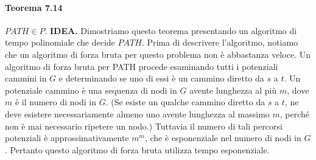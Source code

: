 \documentclass{article}
\begin{document}
\paragraph{Teorema 7.14}
\label{teorema-7.14}
\vspace{1em}
\text{}
\newline
$PATH \in P$.
\newline
\textbf{IDEA.}
Dimostriamo questo teorema presentando un algoritmo di tempo polinomiale che decide $PATH$.
Prima di descrivere l'algoritmo, notiamo che un algoritmo di forza bruta per questo problema non è abbastanza veloce. 
Un algoritmo di forza bruta per PATH procede esaminando tutti i potenziali cammini in $G$ e determinando se uno di essi è un cammino diretto da $s$ a $t$.
Un potenziale cammino è una sequenza di nodi in $G$ avente lunghezza al più $m$, dove $m$ è il numero di nodi in $G$.
(Se esiste un qualche cammino diretto da $s$ a $t$, ne deve esistere necessariamente almeno uno avente lunghezza al massimo $m$, perché non è mai necessario ripetere un nodo.) 
Tuttavia il numero di tali percorsi potenziali è approssimativamente $m^m$, che è esponenziale nel numero di nodi in $G$.
Pertanto questo algoritmo di forza bruta utilizza tempo esponenziale.
 
\end{document}
